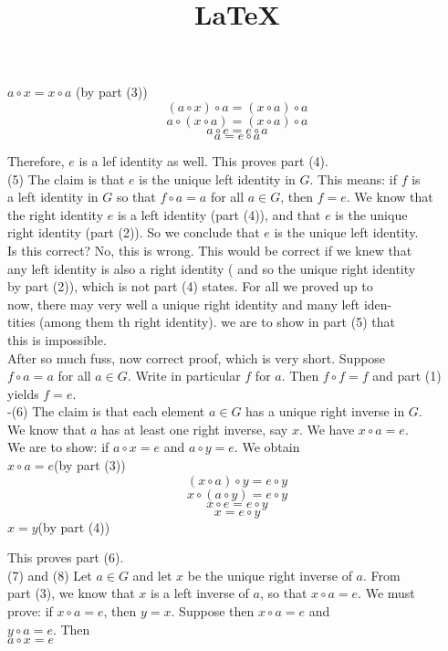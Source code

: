 \documentclass{article}
\title{\LaTeX}
\date{}
\begin{document}
\centering
$a\circ x=x\circ a$ \quad (by part (3))
$$(a\circ x)\circ a = (x\circ a)\circ a$$
$$a\circ (x\circ a) = (x\circ a)\circ a$$
$$a\circ e = e\circ a$$
$$a= e\circ a$$
\raggedright
Therefore, $e$ is a lef identity as well. This proves part (4).\\
(5) The claim is that $e$ is the unique left identity in $G$. This means: if $f$ is\\
a left identity in $G$ so that $f\circ a=a$ for all $a\in G$, then $f=e$. We know that\\
the right identity $e$ is a left identity (part (4)), and that $e$ is the unique \\
right identity (part (2)). So we conclude that $e$ is the unique left identity.\\
Is this correct? No, this is wrong. This would be correct if we knew that \\
any left identity is also a right identity ( and so the unique right identity \\
by part (2)), which is not part (4) states. For all we proved up to \\
now, there may very well a unique right identity and many left iden-\\
tities (among them th right identity). we are to show in part (5) that \\
this is impossible.\\
After so much fuss, now correct proof, which is very short. Suppose\\
$f\circ a=a$ for all $a\in G$. Write in particular $f$ for $a$. Then $f\circ f=f$ and part (1)\\
yields $f = e $.\\

-(6) The claim is that each element $a \in G$ has a unique right inverse in $G$.\\
We know that $a$ has at least one right inverse, say $x$. We have $x \circ a=e$.\\
We are to show: if $a\circ x=e$ and $a\circ y=e$. We obtain\\
\centering
$x\circ a=e$\quad (by part (3))\\
$$(x\circ a)\circ y=e\circ y$$
$$ x\circ(a\circ y)= e\circ y$$
$$x\circ e = e\circ y$$
$$x=e\circ y$$
$x=y$\quad (by part (4))\\

\raggedright 
This proves part (6).\\
(7) and (8) Let $a \in G$ and let $x$ be the unique right inverse of $a$. From \\
part (3), we know that $x$ is a left inverse of $a$, so that $x\circ a=e$. We must \\
prove: if $x \circ a=e$, then $y = x$. Suppose then $x\circ a=e$ and \\
$y \circ a=e$. Then \\
\centering
$a\circ x=e$
\end{document}
